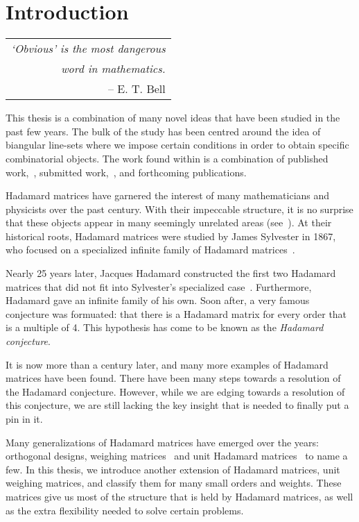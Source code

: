 \chapter[Introduction]{Introduction}
\label{ch:introduction}

\hfill\begin{tabular}{r}\toprule
 {\it `Obvious' is the most dangerous} \\ {\it word in mathematics.} \\
  -- E. T. Bell\\
\bottomrule\end{tabular}\vskip25pt

This thesis is a combination of many novel ideas that have been studied in the past few years. The bulk of the study has been centred around the idea of biangular line-sets where we impose certain conditions in order to obtain specific combinatorial objects. The work found within is a combination of published work,~\cite{much10,unit-weigh13}, submitted work,~\cite{muwm13}, and forthcoming publications.

Hadamard matrices have garnered the interest of many mathematicians and physicists over the past century. With their impeccable structure, it is no surprise that these objects appear in many seemingly unrelated areas (see~\cite{hada-app2,hada-app,space-time-block}). At their historical roots, Hadamard matrices were studied by James Sylvester in 1867, who focused on a specialized infinite family of Hadamard matrices~\cite{sylvester}.

Nearly 25 years later, Jacques Hadamard constructed the first two Hadamard matrices that did not fit into Sylvester's specialized case~\cite{hadamard}. Furthermore, Hadamard gave an infinite family of his own. Soon after, a very famous conjecture was formuated: that there is a Hadamard matrix for every order that is a multiple of 4. This hypothesis has come to be known as the {\it Hadamard conjecture}.

It is now more than a century later, and many more examples of Hadamard matrices have been found. There have been many steps towards a resolution of the Hadamard conjecture. However, while we are edging towards a resolution of this conjecture, we are still lacking the key insight that is needed to finally put a pin in it.

Many generalizations of Hadamard matrices have emerged over the years: orthogonal designs, weighing matrices~\cite{od-quad-forms} and unit Hadamard matrices~\cite{Dita_2004} to name a few. In this thesis, we introduce another extension of Hadamard matrices, unit weighing matrices, and classify them for many small orders and weights. These matrices give us most of the structure that is held by Hadamard matrices, as well as the extra flexibility needed to solve certain problems.

